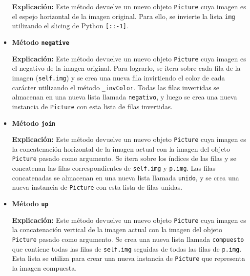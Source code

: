 \documentclass{article}
\begin{document}
\begin{itemize}


\textbf{Explicación:}
Este método devuelve un nuevo objeto \texttt{Picture} cuya imagen es el espejo horizontal de la imagen original. Para ello, se invierte la lista \texttt{img} utilizando el slicing de Python \texttt{[::-1]}.

    \item \textbf{Método \texttt{negative}}



\textbf{Explicación:}
Este método devuelve un nuevo objeto \texttt{Picture} cuya imagen es el negativo de la imagen original. Para lograrlo, se itera sobre cada fila de la imagen (\texttt{self.img}) y se crea una nueva fila invirtiendo el color de cada carácter utilizando el método \texttt{\_invColor}. Todas las filas invertidas se almacenan en una nueva lista llamada \texttt{negativo}, y luego se crea una nueva instancia de \texttt{Picture} con esta lista de filas invertidas.

    \item \textbf{Método \texttt{join}}



\textbf{Explicación:}
Este método devuelve un nuevo objeto \texttt{Picture} cuya imagen es la concatenación horizontal de la imagen actual con la imagen del objeto \texttt{Picture} pasado como argumento. Se itera sobre los índices de las filas y se concatenan las filas correspondientes de \texttt{self.img} y \texttt{p.img}. Las filas concatenadas se almacenan en una nueva lista llamada \texttt{unido}, y se crea una nueva instancia de \texttt{Picture} con esta lista de filas unidas.

    \item \textbf{Método \texttt{up}}



\textbf{Explicación:}
Este método devuelve un nuevo objeto \texttt{Picture} cuya imagen es la concatenación vertical de la imagen actual con la imagen del objeto \texttt{Picture} pasado como argumento. Se crea una nueva lista llamada \texttt{compuesto} que contiene todas las filas de \texttt{self.img} seguidas de todas las filas de \texttt{p.img}. Esta lista se utiliza para crear una nueva instancia de \texttt{Picture} que representa la imagen compuesta.


\end{itemize}
\end{document}
